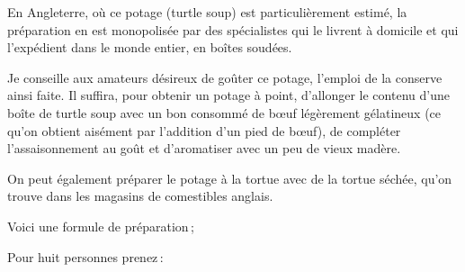 En Angleterre, où ce potage (turtle soup) est particulièrement estimé, la
préparation en est monopolisée par des spécialistes qui le livrent à domicile
et qui l'expédient dans le monde entier, en boîtes soudées.

Je conseille aux amateurs désireux de goûter ce potage, l'emploi de la conserve
ainsi faite. Il suffira, pour obtenir un potage à point, d'allonger le contenu
d'une boîte de turtle soup avec un bon consommé de bœuf légèrement gélatineux
(ce qu'on obtient aisément par l'addition d'un pied de bœuf), de compléter
l'assaisonnement au goût et d'aromatiser avec un peu de vieux madère.

\sk

On peut également préparer le potage à la tortue avec de la tortue séchée,
qu'on trouve dans les magasins de comestibles anglais.

Voici une formule de préparation ;

\medskip

Pour huit personnes prenez :

\medskip

